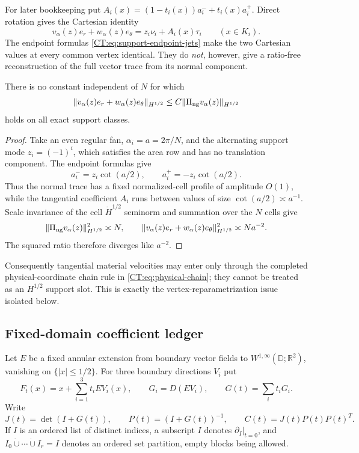 For later bookkeeping put
$A_i(x)=(1-t_i(x))a_i^-+t_i(x)a_i^+$.  Direct rotation gives the Cartesian
identity
\begin{equation}\label{CT:eq:cartesian-support-trace}
 v_\alpha(z)e_r+w_\alpha(z)e_\theta
 =z_i\nu_i+A_i(x)\tau_i\qquad(x\in K_i).
\end{equation}
The endpoint formulas \eqref{CT:eq:support-endpoint-jets} make the two Cartesian
values at every common vertex identical.  They do \emph{not}, however, give
a ratio-free reconstruction of the full vector trace from its normal
component.

\begin{proposition}
\label{CT:prop:no-vector-reconstruction}
There is no constant independent of $N$ for which
\[
 \|v_\alpha(z)e_r+w_\alpha(z)e_\theta\|_{H^{1/2}}
 \le C\|\Pi_{\rm ng} v_\alpha(z)\|_{H^{1/2}}
\]
holds on all exact support classes.
\end{proposition}

\begin{proof}
Take an even regular fan, $\alpha_i=a=2\pi/N$, and the alternating support
mode $z_i=(-1)^i$, which satisfies the area row and has no translation
component.  The endpoint formulas give
\[
 a_i^-=z_i\cot(a/2),\qquad a_i^+=-z_i\cot(a/2).
\]
Thus the normal trace has a fixed normalized-cell profile of amplitude
$O(1)$, while the tangential coefficient $A_i$ runs between values of size
$\cot(a/2)\asymp a^{-1}$.  Scale invariance of the cell
$\dot H^{1/2}$ seminorm and summation over the $N$ cells give
\[
 \|\Pi_{\rm ng} v_\alpha(z)\|_{H^{1/2}}^2\asymp N,
 \qquad
 \|v_\alpha(z)e_r+w_\alpha(z)e_\theta\|_{H^{1/2}}^2
 \asymp Na^{-2}.
\]
The squared ratio therefore diverges like $a^{-2}$.
\end{proof}

Consequently tangential material velocities may enter only through the
completed physical-coordinate chain rule in \eqref{CT:eq:physical-chain}; they
cannot be treated as an $H^{1/2}$ support slot.  This is exactly the
vertex-reparametrization issue isolated below.

\subsection{Fixed-domain coefficient ledger}

Let $E$ be a fixed annular extension from boundary vector fields to
$W^{1,\infty}(\mathbb D;\mathbb R^2)$, vanishing on $\{|x|\le1/2\}$.
For three boundary directions $V_i$ put
\[
 F_t(x)=x+\sum_{i=1}^3t_iEV_i(x),\qquad
 G_i=D(EV_i),\qquad G(t)=\sum_it_iG_i.
\]
Write
\begin{equation}\label{CT:eq:JC}
 J(t)=\det(I+G(t)),\qquad
 P(t)=(I+G(t))^{-1},\qquad
 C(t)=J(t)P(t)P(t)^T.
\end{equation}
If $I$ is an ordered list of distinct indices, a subscript $I$ denotes
$\partial_I|_{t=0}$, and $I_0\dot\cup\cdots\dot\cup I_r=I$ denotes an
ordered set partition, empty blocks being allowed.

